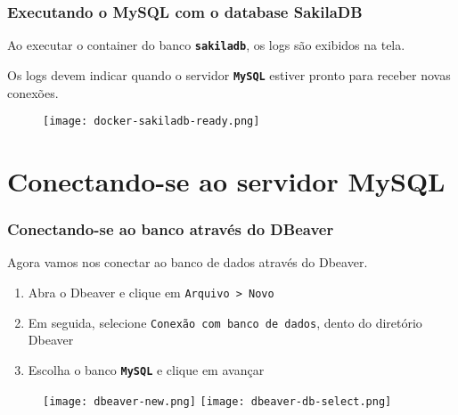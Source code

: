 \documentclass[t, 10pt, aspectratio=169, table, x11names]{beamer}
\begin{document}
	\begin{frame}[t]
		\frametitle{Executando o MySQL com o database SakilaDB}
		Ao executar o container do banco \textbf{\texttt{sakiladb}}, os logs são exibidos na tela.
		
		Os logs devem indicar quando o servidor \texttt{\textbf{MySQL}} estiver pronto para receber novas conexões.
		\vspace{0.1cm}
		\begin{figure}[h]
			\texttt{[image: docker-sakiladb-ready.png]}
		\end{figure}
	\end{frame}

	\section{Conectando-se ao servidor MySQL}

	\begin{frame}[t]
		\frametitle{Conectando-se ao banco através do DBeaver}
		Agora vamos nos conectar ao banco de dados através do Dbeaver.
		
		\begin{enumerate}
			\small
			\item Abra o Dbeaver e clique em \texttt{Arquivo > Novo}
			\item Em seguida, selecione \texttt{Conexão com banco de dados}, dento do diretório Dbeaver
			\item Escolha o banco \texttt{\textbf{MySQL}} e clique em avançar
		\end{enumerate}
		
		\vspace{0.1cm}
		\begin{figure}[h]
			\texttt{[image: dbeaver-new.png]}
			\hspace{0.5cm}
			\texttt{[image: dbeaver-db-select.png]}
		\end{figure}
	\end{frame}
	
\end{document}
